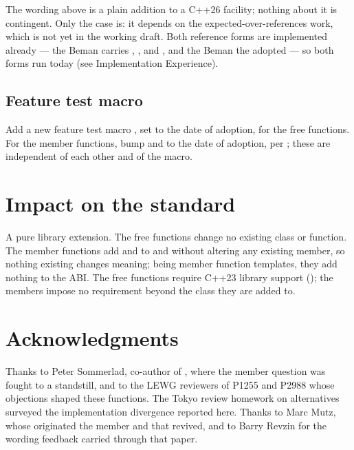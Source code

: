 \documentclass[a4paper,10pt,oneside,openany,final,article]{memoir}
\begin{document}
\pnum
The  wording above is a plain addition to a C++26
facility; nothing about it is contingent. Only the 
case is: it depends on the expected-over-references work, which is not yet in
the working draft. Both reference forms are implemented already --- the Beman
 carries , , and
, and the Beman  the adopted
 --- so both forms run today (see Implementation
Experience).

\section{Feature test macro}

Add a new feature test macro , set to the date of
adoption, for the free functions. For the member functions, bump
 and  to the date of
adoption, per \cite{P3413R0}; these are independent of each other and of the
 macro.

\chapter{Impact on the standard}

A pure library extension. The free functions change no existing class or
function. The member functions add  and
 to  and  without
altering any existing member, so nothing existing changes meaning; being
member function templates, they add nothing to the ABI. The free functions
require C++23 library support ();
the members impose no requirement beyond the class they are added to.

\chapter{Acknowledgments}

Thanks to Peter Sommerlad, co-author of \cite{P2988R12}, where the member
 question was fought to a standstill, and to the LEWG
reviewers of P1255 and P2988 whose objections shaped these functions. The
Tokyo review homework on  alternatives surveyed the
implementation divergence reported here. Thanks to Marc Mutz, whose
\cite{P2218R0} originated the member  and
 that \cite{P3413R0} revived, and to Barry Revzin for the
wording feedback carried through that paper.
\end{document}

